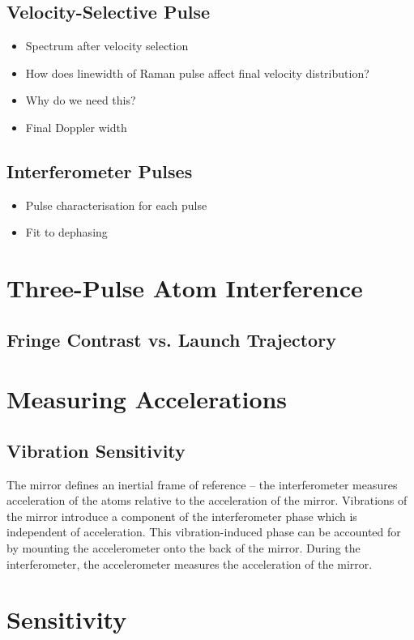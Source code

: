 \subsection{Velocity-Selective Pulse}
\begin{itemize}
	\item Spectrum after velocity selection
	\item How does linewidth of Raman pulse affect final velocity distribution?
	\item Why do we need this?
	\item Final Doppler width
\end{itemize}
\subsection{Interferometer Pulses}
\begin{itemize}
	\item Pulse characterisation for each pulse
	\item Fit to dephasing
\end{itemize}

\section{Three-Pulse Atom Interference} \label{sec:atomint_threepulse}
\subsection{Fringe Contrast vs. Launch Trajectory}\label{subsec:launch_contrast}
\section{Measuring Accelerations}\label{sec:atomint_accelerations}
\subsection{Vibration Sensitivity}\label{sec:vibration_senstivity}
The mirror defines an inertial frame of reference -- the interferometer measures
acceleration of the atoms relative to the acceleration of the mirror. Vibrations
of the mirror introduce a component of the interferometer phase which is
independent of acceleration. This vibration-induced phase can be accounted for
by mounting the accelerometer onto the back of the mirror. During the
interferometer, the accelerometer measures the acceleration of the mirror.

\section{Sensitivity}
